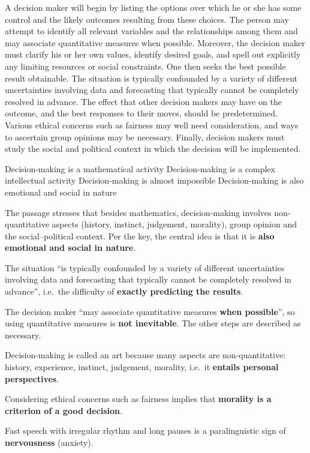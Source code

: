 A decision maker will begin by listing the options over which he or she has some control and the likely outcomes resulting from these choices. The person may attempt to identify all relevant variables and the relationships among them and may associate quantitative measures when possible. Moreover, the decision maker must clarify his or her own values, identify desired goals, and spell out explicitly any limiting resources or social constraints. One then seeks the best possible result obtainable. The situation is typically confounded by a variety of different uncertainties involving data and forecasting that typically cannot be completely resolved in advance. The effect that other decision makers may have on the outcome, and the best responses to their moves, should be predetermined. Various ethical concerns such as fairness may well need consideration, and ways to ascertain group opinions may be necessary. Finally, decision makers must study the social and political context in which the decision will be implemented.

Decision-making is a mathematical activity
Decision-making is a complex intellectual activity
Decision-making is almost impossible
Decision-making is also emotional and social in nature

The passage stresses that besides mathematics, decision-making involves non-quantitative aspects (history, instinct, judgement, morality), group opinion and the social--political context. Per the key, the central idea is that it is \textbf{also emotional and social in nature}.

The situation ``is typically confounded by a variety of different uncertainties involving data and forecasting that typically cannot be completely resolved in advance'', i.e.\ the difficulty of \textbf{exactly predicting the results}.

The decision maker ``may associate quantitative measures \textbf{when possible}'', so using quantitative measures is \textbf{not inevitable}. The other steps are described as necessary.

Decision-making is called an art because many aspects are non-quantitative: history, experience, instinct, judgement, morality, i.e.\ it \textbf{entails personal perspectives}.

Considering ethical concerns such as fairness implies that \textbf{morality is a criterion of a good decision}.

Fast speech with irregular rhythm and long pauses is a paralinguistic sign of \textbf{nervousness} (anxiety).

